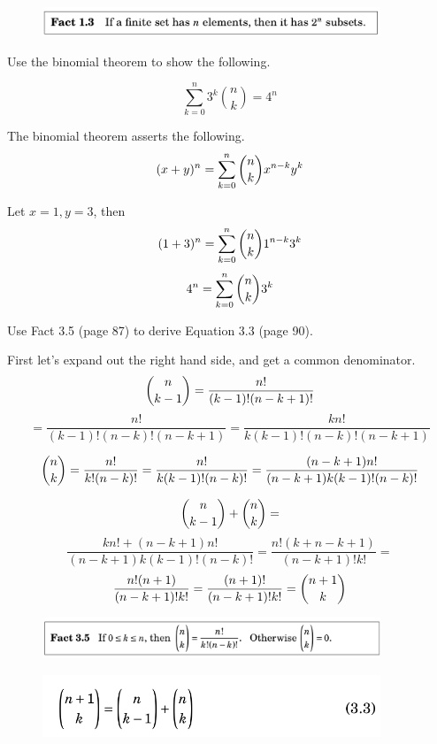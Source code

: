 \documentclass[openany, 11pt]{book}
\begin{document}
\begin{figure}
	\centering
	\includegraphics[width=0.9\textwidth]{images/fact01_03.png}
\end{figure}

\begin{exercise}{}{}
	Use the binomial theorem to show the following.
	\begin{alist}
		\item
		$$\sum\limits_{k=0}^n 3^k \binom{n}{k}=4^n$$
		\item
		The binomial theorem asserts the following.
		$$
			(x+y)^n = \sum\limits_{k=0}^n \dbinom{n}{k} x^{n-k}y^k
		$$
		\item Let $x=1, y=3$, then
		$$
			(1+3)^n = \sum\limits_{k=0}^n \dbinom{n}{k} 1^{n-k}3^k
		$$
		$$
			4^n = \sum\limits_{k=0}^n \dbinom{n}{k} 3^k
		$$
	\end{alist}
\end{exercise}


\begin{exercise}{}{}
	Use Fact 3.5 (page 87) to derive Equation 3.3 (page 90).
	\begin{alist}
		\item First let's expand out the right hand side, and get a common denominator.
		$$\dbinom{n}{k-1} =\dfrac{n!}{(k-1)!(n-k+1)!}$$
		$$=\dfrac{n!}{(k-1)!(n-k)!(n-k+1)} =\dfrac{kn!}{k(k-1)!(n-k)!(n-k+1)}$$

		$$\dbinom{n}{k}=\dfrac{n!}{k!(n-k)!}=
			\dfrac{n!}{k(k-1)!(n-k)!}=
			\dfrac{(n-k+1)n!}{(n-k+1)k(k-1)!(n-k)!}
		$$

		$$\dbinom{n}{k-1} + \dbinom{n}{k}=$$
		$$ \dfrac{kn!+(n-k+1)n!}{(n-k+1)k(k-1)!(n-k)!}=
			\dfrac{n!(k+n-k+1)}{(n-k+1)!k!}= $$
		$$ \dfrac{n!(n+1)}{(n-k+1)!k!}=
			\dfrac{(n+1)!}{(n-k+1)!k!}= \dbinom{n+1}{k}$$
	\end{alist}
\end{exercise}

\begin{figure}
	\centering
	\includegraphics[width=0.9\textwidth]{images/fact03_05.png}
\end{figure}
\begin{figure}
	\centering
	\includegraphics[width=0.9\textwidth]{images/equation03_03.png}
\end{figure}
\end{document}
